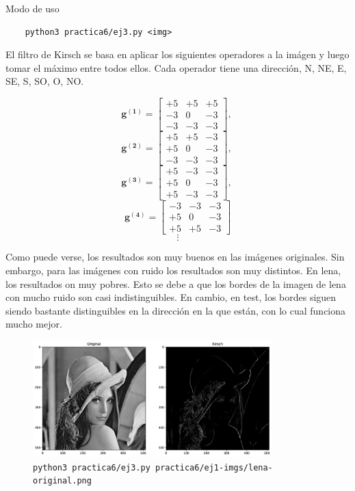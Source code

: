 \documentclass[11pt, spanish]{article}
\begin{document}
Modo de uso
\begin{verbatim}
    python3 practica6/ej3.py <img>
\end{verbatim}

El filtro de Kirsch se basa en aplicar los siguientes operadores a la imágen y luego tomar el máximo entre todos ellos. Cada operador tiene una dirección, N, NE, E, SE, S, SO, O, NO. 

\[
\mathbf{g^{(1)}} = \begin{bmatrix} 
+5 & +5 & +5 \\
-3 &  0 & -3 \\
-3 & -3 & -3 
\end{bmatrix},\
\]
\[
\mathbf{g^{(2)}} = \begin{bmatrix} 
+5 & +5 & -3 \\
+5 &  0 & -3 \\
-3 & -3 & -3 
\end{bmatrix},\ 
\]
\[
\mathbf{g^{(3)}} = \begin{bmatrix} 
+5 & -3 & -3 \\
+5 &  0 & -3 \\
+5 & -3 & -3 
\end{bmatrix},\ 
\]
\[
\mathbf{g^{(4)}} = \begin{bmatrix} 
-3 & -3 & -3 \\
+5 &  0 & -3 \\
+5 & +5 & -3 
\end{bmatrix}
\]
\[
\vdots
\]

Como puede verse, los resultados son muy buenos en las imágenes originales. Sin embargo, para las imágenes con ruido los resultados son muy distintos. En lena, los resultados on muy pobres. Esto se debe a que los bordes de la imagen de lena con mucho ruido son casi indistinguibles. En cambio, en test, los bordes siguen siendo bastante distinguibles en la dirección en la que están, con lo cual funciona mucho mejor.

\begin{figure}[H]
\centering
    \includegraphics[height=4.5cm]{informe-imgs/ej3--lena-original.jpg}
    \caption{\texttt{python3 practica6/ej3.py practica6/ej1-imgs/lena-original.png }}
\end{figure}
\end{document}

